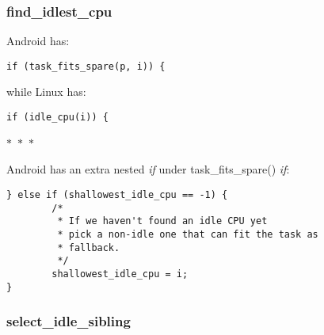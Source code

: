 \documentclass{article}
\newcommand{\divider}{{\begin{center}
  $\ast$~$\ast$~$\ast$
\end{center}}}
\begin{document}
\subsubsection{find\_idlest\_cpu}

Android has:
\begin{verbatim}
if (task_fits_spare(p, i)) {
\end{verbatim}
while Linux has:
\begin{verbatim}
if (idle_cpu(i)) {
\end{verbatim}
\divider
Android has an extra nested \textit{if} under task\_fits\_spare() \textit{if}:
\begin{verbatim}
} else if (shallowest_idle_cpu == -1) {
        /*
         * If we haven't found an idle CPU yet
         * pick a non-idle one that can fit the task as
         * fallback.
         */
        shallowest_idle_cpu = i;
}
\end{verbatim}

\subsubsection{select\_idle\_sibling}
\end{document}
